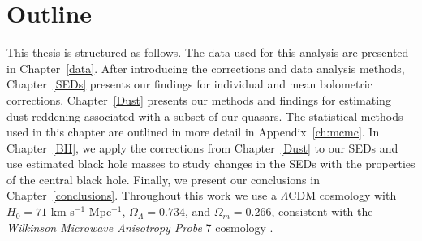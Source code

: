
\section{Outline}

This thesis is structured as follows. The data used for this analysis are presented in Chapter~\ref{data}.  After introducing the corrections and data analysis methods, Chapter~\ref{SEDs} presents our findings for individual and mean bolometric corrections.  Chapter~\ref{Dust} presents our methods and findings for estimating dust reddening associated with a subset of our quasars.  The statistical methods used in this chapter are outlined in more detail in Appendix~\ref{ch:mcmc}. In Chapter~\ref{BH}, we apply the corrections from Chapter~\ref{Dust} to our SEDs and use estimated black hole masses to study changes in the SEDs with the properties of the central black hole. Finally, we present our conclusions in Chapter~\ref{conclusions}. Throughout this work we use a $\Lambda$CDM cosmology with $H_0=71$ km s$^{-1}$ Mpc$^{-1}$, $\Omega_\Lambda = 0.734$, and $\Omega_m = 0.266$, consistent with the {\em Wilkinson Microwave Anisotropy Probe} 7 cosmology \citep{Jarosik:2011}.

